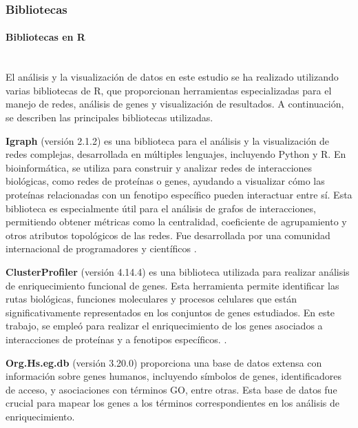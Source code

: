 \subsubsection{Bibliotecas}


\paragraph{Bibliotecas en R} \mbox{}\\

El análisis y la visualización de datos en este estudio se ha realizado utilizando varias bibliotecas de R, que proporcionan herramientas especializadas para el manejo de redes, análisis de genes y visualización de resultados. A continuación, se describen las principales bibliotecas utilizadas.

\textbf{Igraph} (versión 2.1.2) es una biblioteca para el análisis y la visualización de redes complejas, desarrollada en múltiples lenguajes, incluyendo Python y R. En bioinformática, se utiliza para construir y analizar redes de interacciones biológicas, como redes de proteínas o genes, ayudando a visualizar cómo las proteínas relacionadas con un fenotipo específico pueden interactuar entre sí. Esta biblioteca es especialmente útil para el análisis de grafos de interacciones, permitiendo obtener métricas como la centralidad, coeficiente de agrupamiento y otros atributos topológicos de las redes. Fue desarrollada por una comunidad internacional de programadores y científicos\cite{valdez2016analisis} \cite{igraphref} \cite{igraphmanual}.

\textbf{ClusterProfiler} (versión 4.14.4) es una biblioteca utilizada para realizar análisis de enriquecimiento funcional de genes. Esta herramienta permite identificar las rutas biológicas, funciones moleculares y procesos celulares que están significativamente representados en los conjuntos de genes estudiados. En este trabajo, se empleó para realizar el enriquecimiento de los genes asociados a interacciones de proteínas y a fenotipos específicos. \cite{clusterprofiler1} \cite{clusterprofiler2} \cite{clusterprofiler3} \cite{clusterprofiler4}.

\textbf{Org.Hs.eg.db} (versión 3.20.0) proporciona una base de datos extensa con información sobre genes humanos, incluyendo símbolos de genes, identificadores de acceso, y asociaciones con términos GO, entre otras. Esta base de datos fue crucial para mapear los genes a los términos correspondientes en los análisis de enriquecimiento. \cite{org.Hs.eg.db_manual}

